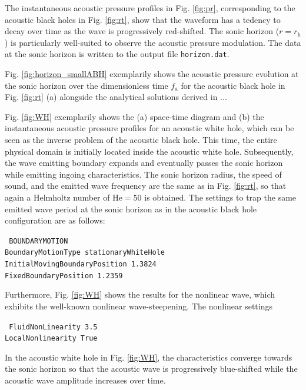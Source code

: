 The instantaneous acoustic pressure profiles in Fig. \ref{fig:pr}, corresponding to the acoustic black holes in Fig. \ref{fig:rt}, show that the waveform has a tedency to decay over time as the wave is progressively red-shifted. The sonic horizon ($r=r_{\mathrm{h}}$) is particularly well-suited to observe the acoustic pressure modulation. The data at the sonic horizon is written to the output file {\tt horizon.dat}.

Fig. \ref{fig:horizon_smallABH} exemplarily shows the acoustic pressure evolution at the sonic horizon over the dimensionless time $f_{\mathrm{a}}$ for the acoustic black hole in Fig. \ref{fig:rt} (a) alongside the analytical solutions derived in ...

Fig. \ref{fig:WH} exemplarily shows the (a) space-time diagram and (b) the instantaneous acoustic pressure profiles for an acoustic white hole, which can be seen as the inverse problem of the acoustic black hole. This time, the entire physical domain is initially located inside the acoustic white hole. Subsequently, the wave emitting boundary expands and eventually passes the sonic horizon while emitting ingoing characteristics. The sonic horizon radius, the speed of sound, and the emitted wave frequency are the same as in Fig. \ref{fig:rt}, so that again a Helmholtz number of $\mathrm{He}=50$ is obtained. The settings to trap the same emitted wave period at the sonic horizon as in the acoustic black hole configuration are as follows:

{\tt
BOUNDARYMOTION \\
BoundaryMotionType stationaryWhiteHole \\
InitialMovingBoundaryPosition 1.3824 \\
FixedBoundaryPosition 1.2359
}

Furthermore, Fig. \ref{fig:WH} shows the results for the nonlinear wave, which exhibits the well-known nonlinear wave-steepening. The nonlinear settings

{\tt
FluidNonLinearity 3.5 \\
LocalNonlinearity True
}

In the acoustic white hole in Fig. \ref{fig:WH}, the characteristics converge towards the sonic horizon so that the acoustic wave is progressively blue-shifted while the acoustic wave amplitude increases over time. 

